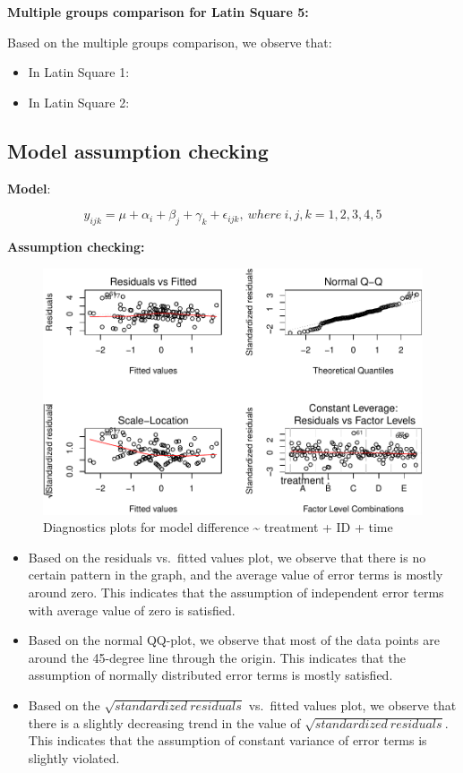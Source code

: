 \documentclass[]{article}
\providecommand{\tightlist}{%
  \setlength{\itemsep}{0pt}\setlength{\parskip}{0pt}}
\begin{document}
\textbf{Multiple groups comparison for Latin Square 5:}

Based on the multiple groups comparison, we observe that:

\begin{itemize}
\tightlist
\item
  In Latin Square 1:
\item
  In Latin Square 2:
\end{itemize}

\subsection{Model assumption checking}\label{model-assumption-checking}

\textbf{Model}:

\[y_{ijk} = \mu + \alpha_{i} + \beta_{j} + \gamma_{k} + \epsilon_{ijk},\ where\  i, j, k = 1, 2, 3, 4, 5\]

\textbf{Assumption checking:}

\begin{figure}
\centering
\includegraphics{STATS101B-Project_files/figure-latex/unnamed-chunk-11-1.pdf}
\caption{Diagnostics plots for model difference \textasciitilde{}
treatment + ID + time}
\end{figure}

\begin{itemize}
\tightlist
\item
  Based on the residuals vs.~fitted values plot, we observe that there
  is no certain pattern in the graph, and the average value of error
  terms is mostly around zero. This indicates that the assumption of
  independent error terms with average value of zero is satisfied.
\item
  Based on the normal QQ-plot, we observe that most of the data points
  are around the 45-degree line through the origin. This indicates that
  the assumption of normally distributed error terms is mostly
  satisfied.
\item
  Based on the \(\sqrt{standardized\ residuals}\) vs.~fitted values
  plot, we observe that there is a slightly decreasing trend in the
  value of \(\sqrt{standardized\ residuals}\). This indicates that the
  assumption of constant variance of error terms is slightly violated.
\end{itemize}
\end{document}
